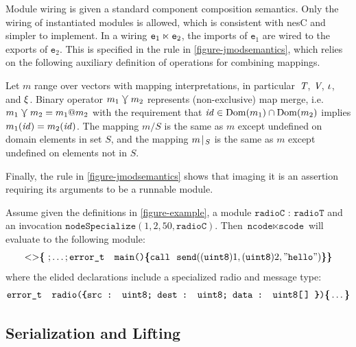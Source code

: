 Module wiring is given a standard component composition semantics. Only the wiring of
instantiated modules is allowed, which is consistent with nesC and simpler to implement. In a
wiring $\texttt{e}_1 \ltimes \texttt{e}_2$, the imports of $\texttt{e}_1$ are wired to the
exports of $\texttt{e}_2$. This is specified in the  rule in
\autoref{figure-jmodsemantics}, which relies on the following auxiliary definition of operations
for combining mappings.
\begin{definition}
  Let $m$ range over vectors with mapping interpretations, in particular~$\textit{T}$, $\textit{V}$,
  $\iota$, and $\xi$. Binary operator $m_1\curlyveedownarrow m_2$ represents (non-exclusive)
  map merge, i.e.~$m_1 \curlyveedownarrow m_2 = m_1 @ m_2$ with the requirement that $\mathit{id}\in
  {\rm Dom}(m_1)\cap{\rm Dom}(m_2)$ implies $m_1(\mathit{id}) = m_2(\mathit{id})$. The mapping $m / S$ is
  the same as $m$ except undefined on domain elements in set $S$, and the mapping
  $m\!\mid\!_{S}$ is the same as $m$ except undefined on elements not in ${S}$.
\end{definition}
Finally, the  rule in \autoref{figure-jmodsemantics} shows that imaging it is
an assertion requiring its arguments to be a runnable module.

\begin{example}
\label{example-scalanesssemantics}
Assume given the definitions in \autoref{figure-example}, a module $\texttt{radioC : radioT}$
and an invocation $\texttt{nodeSpecialize}(1,2,50,\texttt{radioC})$. Then $\texttt{ncode}
\ltimes \texttt{scode}$ will evaluate to the following module:
$$
\margs{}\lc\ ; \ldots; \texttt{error\_t\ \ main()} \lc \texttt{call}\ \ \texttt{send}((\texttt{uint8})1, (\texttt{uint8})2, "\texttt{hello}") \rc\rc
$$  
where the elided declarations include a specialized radio and message type:
$$
\texttt{error\_t\ \ radio(\lc \texttt{src : uint8}; \texttt{dest : uint8}; \texttt{data : uint8[\,]} \rc)} \lc \ldots \rc
$$
\end{example}

\subsection{Serialization and Lifting}
\label{section-serialization}


